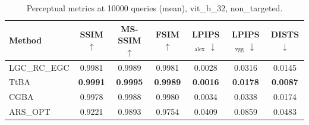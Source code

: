 \begin{table}[t]
\centering\footnotesize
\caption{Perceptual metrics at 10000 queries (mean), vit\_b\_32, non\_targeted.}
\begin{tabular}{lcccccc}
\toprule
Method & SSIM $\uparrow$ & MS-SSIM $\uparrow$ & FSIM $\uparrow$ & LPIPS$_{\mathrm{alex}}$ $\downarrow$ & LPIPS$_{\mathrm{vgg}}$ $\downarrow$ & DISTS $\downarrow$ \\
\midrule
LGC\_RC\_EGC & 0.9981 & 0.9989 & 0.9981 & 0.0028 & 0.0316 & 0.0145 \\
TtBA & \textbf{0.9991} & \textbf{0.9995} & \textbf{0.9989} & \textbf{0.0016} & \textbf{0.0178} & \textbf{0.0087} \\
CGBA & 0.9978 & 0.9988 & 0.9980 & 0.0034 & 0.0338 & 0.0174 \\
ARS\_OPT & 0.9221 & 0.9893 & 0.9754 & 0.0409 & 0.0859 & 0.0483 \\
\bottomrule
\end{tabular}
\end{table}

